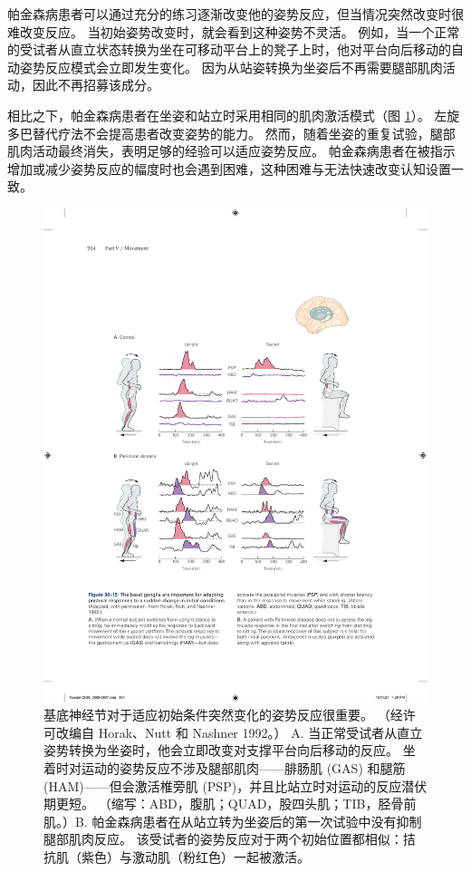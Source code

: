 帕金森病患者可以通过充分的练习逐渐改变他的姿势反应，但当情况突然改变时很难改变反应。
当初始姿势改变时，就会看到这种姿势不灵活。
例如，当一个正常的受试者从直立状态转换为坐在可移动平台上的凳子上时，他对平台向后移动的自动姿势反应模式会立即发生变化。
因为从站姿转换为坐姿后不再需要腿部肌肉活动，因此不再招募该成分。


相比之下，帕金森病患者在坐姿和站立时采用相同的肌肉激活模式（图 \ref{fig:36_15}）。
左旋多巴替代疗法不会提高患者改变姿势的能力。
然而，随着坐姿的重复试验，腿部肌肉活动最终消失，表明足够的经验可以适应姿势反应。
帕金森病患者在被指示增加或减少姿势反应的幅度时也会遇到困难，这种困难与无法快速改变认知设置一致。


\begin{figure}[htbp]
	\centering
	\includegraphics[width=0.85\linewidth]{chap36/fig_36_15}
	\caption{基底神经节对于适应初始条件突然变化的姿势反应很重要。 （经许可改编自 Horak、Nutt 和 Nashner 1992。） A. 当正常受试者从直立姿势转换为坐姿时，他会立即改变对支撑平台向后移动的反应。 坐着时对运动的姿势反应不涉及腿部肌肉——腓肠肌 (GAS) 和腿筋 (HAM)——但会激活椎旁肌 (PSP)，并且比站立时对运动的反应潜伏期更短。 （缩写：ABD，腹肌；QUAD，股四头肌；TIB，胫骨前肌。）B. 帕金森病患者在从站立转为坐姿后的第一次试验中没有抑制腿部肌肉反应。 该受试者的姿势反应对于两个初始位置都相似：拮抗肌（紫色）与激动肌（粉红色）一起被激活。}
	\label{fig:36_15}
\end{figure}



